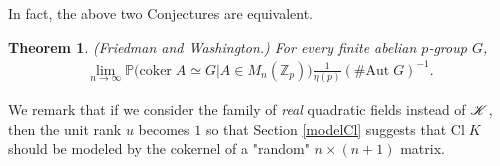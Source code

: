 \documentclass[12pt,reqno]{amsart}
\newtheorem{thm}{Theorem}[section]
\numberwithin{equation}{section}
\def\Z{{\mathbb Z}}
\def\P{{\mathbb P}}
\begin{document}
In fact, the above two Conjectures are equivalent.

\begin{thm}{\rm (Friedman and Washington.)} For every finite abelian $p$-group $G$,
\begin{align*}
\lim_{n \to \infty} \P\big( \text{coker} \; A \simeq G | A \in M_n(\Z_p)\big) \frac{1}{\eta(p)} (\# \text{Aut} \; G)^{-1}.
\end{align*}
\end{thm}

We remark that if we consider the family of \textit{real} quadratic fields instead of ${\mathscr K}$, then the unit rank $u$ becomes $1$ so that Section \ref{modelCl} suggests that $\text{Cl} \; K$ should be modeled by the cokernel of a "random" $n \times (n+1)$ matrix.
\end{document}
